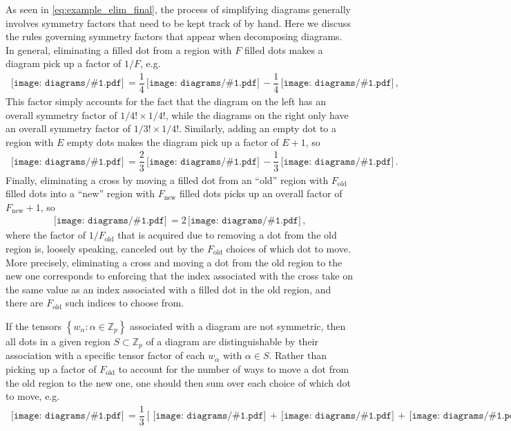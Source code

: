 \documentclass[nofootinbib,notitlepage,11pt]{revtex4-2}
\renewcommand{\t}{\text} %
\newcommand{\f}[2]{\dfrac{#1}{#2}} %
\renewcommand{\sp}[1]{\left[#1\right]} %
\renewcommand{\set}[1]{\left\{#1\right\}} %
\newcommand{\1}{\mathds{1}}
\newcommand{\ZZ}{\mathbb{Z}}
\newcommand{\diagram}[1]
{\,\texttt{[image: diagrams/\#1.pdf]}\,}
\begin{document}
As seen in \eqref{eq:example_elim_final}, the process of simplifying
diagrams generally involves symmetry factors that need to be kept
track of by hand.  Here we discuss the rules governing symmetry
factors that appear when decomposing diagrams.  In general,
eliminating a filled dot from a region with $F$ filled dots makes a
diagram pick up a factor of $1/F$, e.g.
\begin{align}
  \diagram{example_sym}
  = \f14 \diagram{example_sym_o}
  - \f14 \diagram{example_sym_x},
\end{align}
This factor simply accounts for the fact that the diagram on the left
has an overall symmetry factor of $1/4!\times1/4!$, while the diagrams
on the right only have an overall symmetry factor of $1/3!\times1/4!$.
Similarly, adding an empty dot to a region with $E$ empty dots makes
the diagram pick up a factor of $E+1$, so
\begin{align}
  \diagram{example_sym_o}
  = \f23 \diagram{example_sym_oo}
  - \f13 \diagram{example_sym_ox}.
\end{align}
Finally, eliminating a cross by moving a filled dot from an ``old''
region with $F_{\t{old}}$ filled dots into a ``new'' region with
$F_{\t{new}}$ filled dots picks up an overall factor of
$F_{\t{new}}+1$, so
\begin{align}
  \diagram{example_sym_x}
  = 2 \diagram{example_sym_x_elim},
\end{align}
where the factor of $1/F_{\t{old}}$ that is acquired due to removing a
dot from the old region is, loosely speaking, canceled out by the
$F_{\t{old}}$ choices of which dot to move.  More precisely,
eliminating a cross and moving a dot from the old region to the new
one corresponds to enforcing that the index associated with the cross
take on the same value as an index associated with a filled dot in the
old region, and there are $F_{\t{old}}$ such indices to choose from.

If the tensors $\set{w_\alpha:\alpha\in\ZZ_p}$ associated with a
diagram are not symmetric, then all dots in a given region
$S\subset\ZZ_p$ of a diagram are distinguishable by their association
with a specific tensor factor of each $w_\alpha$ with $\alpha\in S$.
Rather than picking up a factor of $F_{\t{old}}$ to account for the
number of ways to move a dot from the old region to the new one, one
should then sum over each choice of which dot to move, e.g.
\begin{align}
  \diagram{example_sym_x_color}
  = \f13 \sp{\diagram{example_sym_x_color_r}
    + \diagram{example_sym_x_color_m}
    + \diagram{example_sym_x_color_b}}.
\end{align}
\end{document}
